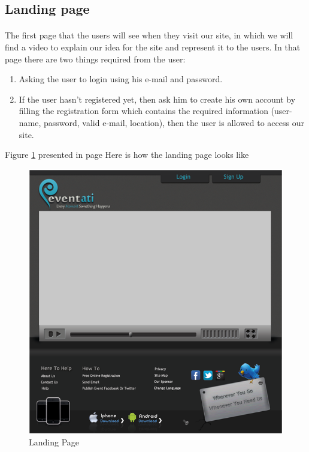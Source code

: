 \documentclass[12pt,a4paper,class,twoside,openany]{report}
\begin{document}
{ \subsection{Landing  page}
\paragraph*{\hspace{.9 cm} }  The first page that the users will see when they visit our site, in which we will find a video to explain our idea for the site and represent it to the users.
In that page there are two things required from the user:
\begin{enumerate}
\item Asking the user to login using his e-mail and password.

\item If the user hasn't registered yet, then ask him to create his own account by filling the registration form which contains the required information (user-name, password, valid e-mail, location), then the user is allowed to access our site.
\end{enumerate}
Figure \ref{fg:4-16} presented in page \pageref{fg:4-16} Here is how the landing page looks like
\begin{figure}
\begin{center}
\includegraphics[height=5 in]{4-16}
\caption{Landing Page}
\label{fg:4-16}
\end{center}
\end{figure}
}
\end{document}
